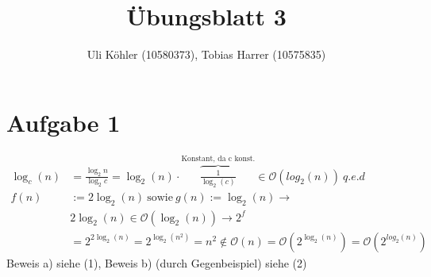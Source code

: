 \documentclass[a4paper,10pt,oneside,leqno]{scrartcl}
\title{Übungsblatt 3}
\author{Uli Köhler (10580373), Tobias Harrer (10575835)}
\begin{document}
\maketitle

\section*{Aufgabe 1}
\renewcommand{\theequation}{\alph{equation}}
\begin{align}
  \log_{c}(n) &= \frac{\log_{2}{n}}{\log_{2}{c}} = \log_2(n)\cdot\overbrace{\frac{1}{\log_2(c)}}^{\text{Konstant, da c konst.}} \in \mathcal{O}(log_2(n))\ q.e.d\\
  f(n) &:= 2\log_2(n)\ \text{sowie}\ g(n) := \log_2(n) \rightarrow\\
  &2\log_2(n) \in \mathcal{O}(\log_2(n)) \rightarrow 2^{f}\nonumber\\
  &=2^{2\log_2(n)}=2^{\log_2(n^2)}=n^2 \notin \mathcal{O}(n) = \mathcal{O}(2^{\log_2(n)}) = \mathcal{O}(2^{log_2(n)})\nonumber
\end{align}
Beweis a) siehe (1), Beweis b) (durch Gegenbeispiel) siehe (2)
\end{document}
